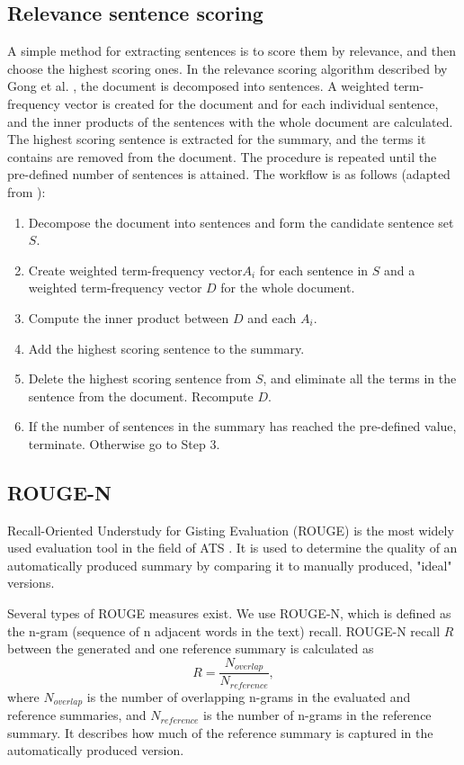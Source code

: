 \documentclass[conference]{IEEEtran}
\begin{document}
\subsection{Relevance sentence scoring}
A simple method for extracting sentences is to score them by relevance, and then choose the highest scoring ones. In the relevance scoring algorithm described by Gong et al. \cite{gong2001}, the document is decomposed into sentences. A weighted term-frequency vector is created for the document and for each individual sentence, and the inner products of the sentences with the whole document are calculated. The highest scoring sentence is extracted for the summary, and the terms it contains are removed from the document. The procedure is repeated until the pre-defined number of sentences is attained. The workflow is as follows (adapted from \cite{gong2001}):
\begin{enumerate}
	\item Decompose the document into sentences and form the candidate sentence set $S$.
	\item Create weighted term-frequency vector$A_i$  for each sentence in $S$ and a weighted term-frequency vector $D$ for the whole document.
	\item Compute the inner product between $D$ and each $A_i$.
	\item Add the highest scoring sentence to the summary.
	\item Delete the highest scoring sentence from $S$, and eliminate all the terms in the sentence from the document. Recompute $D$.
	\item If the number of sentences in the summary has reached the pre-defined value, terminate. Otherwise go to Step 3.
\end{enumerate}


\subsection{ROUGE-N}
Recall-Oriented Understudy for Gisting Evaluation (ROUGE) \cite{lin2004} is the most widely used evaluation tool in the field of ATS \cite{el-kassas2020}. It is used to determine the quality of an automatically produced summary by comparing it to manually produced, "ideal" versions. 

Several types of ROUGE measures exist. We use ROUGE-N, which is defined as the n-gram (sequence of n adjacent words in the text) recall. ROUGE-N recall $R$ between the generated and one reference summary is calculated as
\begin{equation}
R = \frac{N_{overlap}}{N_{reference}},
\end{equation}
where $N_{overlap}$ is the number of overlapping n-grams in the evaluated and reference summaries, and $N_{reference}$ is the number of n-grams in the reference summary. It describes how much of the reference summary is captured in the automatically produced version.
\end{document}
